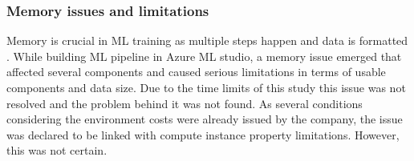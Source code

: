 
%
%
%
%


\subsubsection*{Memory issues and limitations}
Memory is crucial in ML training
as multiple steps happen
and data is formatted \etc. %
While building ML pipeline in Azure ML studio,
a memory issue emerged
that affected several components
and caused serious limitations
in terms of usable components and data size.
Due to the time limits of this study
this issue was not resolved
and the problem behind it was not found.
As several conditions
considering the environment costs
were already issued by the company,
the issue was declared to be linked with
compute instance property limitations.
However, this was not certain.

